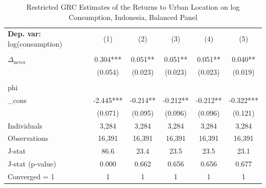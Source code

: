 \begin{table}[htbp] \centering \begin{threeparttable}
 \caption{Restricted GRC Estimates of the Returns to Urban Location on log Consumption, Indonesia, Balanced Panel} 
 \label{tab:GRC_IDN_consumption_urban_bal} 
\begin{tabular}{l ccccc} \toprule  \textbf{Dep. var:}  log(consumption) 
                    &\multicolumn{1}{c}{(1)}   &\multicolumn{1}{c}{(2)}   &\multicolumn{1}{c}{(3)}   &\multicolumn{1}{c}{(4)}   &\multicolumn{1}{c}{(5)}   \\
                    &               &               &               &               &               \\
\addlinespace
$\Delta_{\text{never}}$&       0.304***&       0.051** &       0.051** &       0.051** &       0.040** \\
                    &     (0.054)   &     (0.023)   &     (0.023)   &     (0.023)   &     (0.019)   \\
                    &               &               &               &               &               \\
\addlinespace
phi                 &               &               &               &               &               \\
_cons               &      -2.445***&      -0.214** &      -0.212** &      -0.212** &      -0.322***\\
                    &     (0.071)   &     (0.095)   &     (0.096)   &     (0.096)   &     (0.121)   \\
\addlinespace
Individuals         &       3,284   &       3,284   &       3,284   &       3,284   &       3,284   \\
Observations        &      16,391   &      16,391   &      16,391   &      16,391   &      16,391   \\
J-stat              &        86.6   &        23.4   &        23.5   &        23.5   &        23.1   \\
J-stat (p-value)    &       0.000   &       0.662   &       0.656   &       0.656   &       0.677   \\
Converged = 1       &           1   &           1   &           1   &           1   &           1   \\

\end{tabular}
\end{threeparttable}
\end{table}
